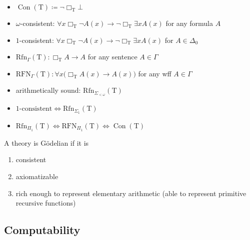 \documentclass[UTF8,11pt,colorlinks,compress,openany]{beamer}%
\begin{document}
\begin{frame}\frametitle{}
	\begin{itemize}
		\item $\operatorname{Con}(\mathrm{T})\coloneqq \neg\Box_\mathrm{T}\bot$
		\item $\omega$-consistent: $\forall x\Box_\mathrm{T}\neg A(x)\to\neg\Box_\mathrm{T}\exists x A(x)$ for any formula $A$
		\item $1$-consistent: $\forall x\Box_\mathrm{T}\neg A(x)\to\neg\Box_\mathrm{T}\exists x A(x)$ for $A\in\Delta_0$
		\item $\mathrm{Rfn}_\Gamma(\mathrm{T}): \Box_\mathrm{T}A\to A$ for any sentence $A\in\Gamma$
		\item $\mathrm{RFN}_\Gamma(\mathrm{T}):\forall x\big(\Box_\mathrm{T}A(x)\to A(x)\big)$ for any wff $A\in\Gamma$
		\item arithmetically sound: $\mathrm{Rfn}_{\Sigma_{<\omega}}(\mathrm{T})$
		\item 
		$1\text{-consistent}\iff\mathrm{Rfn}_{\Sigma_1}(\mathrm{T})$
		\item $\mathrm{Rfn}_{\Pi_1}(\mathrm{T})\iff\mathrm{RFN}_{\Pi_1}(\mathrm{T})\iff\operatorname{Con}(\mathrm{T})$
	\end{itemize}
\begin{definition}
	A theory is G\"odelian if it is
	\begin{enumerate}
		\item consistent
		\item axiomatizable
		\item rich enough to represent elementary arithmetic (able to represent primitive recursive functions)
	\end{enumerate}
\end{definition}
\end{frame}

\subsection{Computability}
\end{document}
